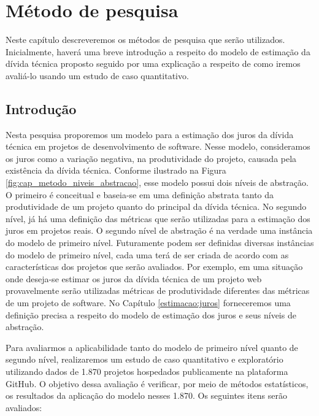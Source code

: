 \chapter{Método de pesquisa}
\label{cap:metodologia}

Neste capítulo descreveremos os métodos de pesquisa que serão utilizados. Inicialmente, haverá uma breve  introdução a respeito do modelo de estimação da dívida técnica proposto seguido por uma explicação a respeito de como iremos avaliá-lo usando um estudo de caso  quantitativo.

\section{Introdução}

Nesta pesquisa proporemos um modelo para a estimação dos juros da dívida técnica em projetos de desenvolvimento de software. Nesse modelo, consideramos os juros como a variação negativa, na produtividade do projeto, causada pela existência da dívida técnica. Conforme ilustrado na Figura \ref{fig:cap_metodo_niveis_abstracao}, esse modelo possui dois níveis de abstração. O primeiro é conceitual e baseia-se em uma definição abstrata tanto da produtividade de um projeto quanto do principal da dívida técnica. No segundo nível, já há uma definição das métricas que serão utilizadas para a estimação dos juros em projetos reais. O segundo nível de abstração é na verdade uma instância do modelo de primeiro nível. Futuramente podem ser definidas diversas instâncias do modelo de primeiro nível, cada uma terá de ser criada de acordo com as características dos projetos que serão avaliados. Por exemplo, em uma situação onde deseja-se estimar os juros da dívida técnica de um projeto web provavelmente serão utilizadas métricas de produtividade diferentes das métricas de um projeto de software. No Capítulo \ref{estimacao:juros} forneceremos  uma definição precisa a respeito do modelo de estimação dos juros e seus níveis de abstração. 

Para avaliarmos a aplicabilidade tanto do modelo de primeiro nível quanto de segundo nível, realizaremos um estudo de caso quantitativo e exploratório utilizando dados de 1.870 projetos hospedados publicamente na plataforma GitHub. O objetivo dessa avaliação é verificar,  por meio de métodos estatísticos,  os resultados da aplicação do modelo nesses 1.870. Os seguintes itens serão avaliados:

